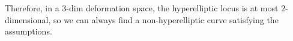 \documentclass[UTF8]{amsart}
\numberwithin{equation}{section}
\theoremstyle{plain}
\numberwithin{equation}{section}
\theoremstyle{remark}
\begin{document}
Therefore, in a $3$-dim deformation space, the hyperelliptic locus is at most $2$-dimensional, so we can always find a non-hyperelliptic curve satisfying the assumptions.





\end{document}
